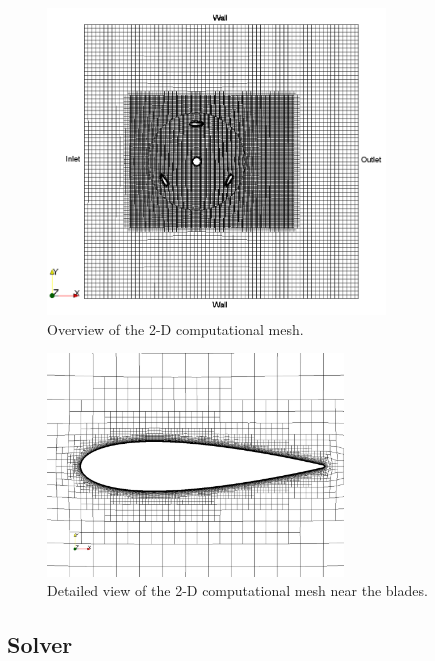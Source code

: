 \documentclass[aip,graphicx]{revtex4-1}
\begin{document}
\begin{figure}
    \centering

    \includegraphics[width=0.8\textwidth]{2D_mesh}

    \caption{Overview of the 2-D computational mesh.}

    \label{fig:2d-br-mesh}
\end{figure}


\begin{figure}
    \centering

    \includegraphics[width=0.7\textwidth]{2D_blade_mesh_closeup}

    \caption{Detailed view of the 2-D computational mesh near the blades.}

    \label{fig:blade-mesh}
\end{figure}


\subsection{Solver}
\end{document}
